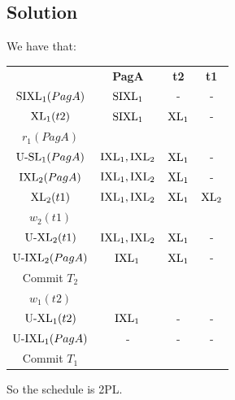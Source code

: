 \documentclass[12pt, a4paper]{report}
\begin{document}
    \subsection*{Solution}
        We have that: 
        \begin{table}[H]
            \centering
            \begin{tabular}{c|ccc|}
            \cline{2-4}
            \textit{}                    & \textbf{PagA}                           & \textbf{t2}          & \textbf{t1}           \\ \cline{2-4} 
            $\textnormal{SIXL}_1(PagA)$  & $\textnormal{SIXL}_1$                   & -                    & -                     \\
            $\textnormal{XL}_1(t2)$      & $\textnormal{SIXL}_1$                   & $\textnormal{XL}_1$  & -                     \\
            $r_1(PagA)$                  &                                         &                      &                       \\
            $\textnormal{U-SL}_1(PagA)$  & $\textnormal{IXL}_1,\textnormal{IXL}_2$ & $\textnormal{XL}_1$  & -                     \\
            $\textnormal{IXL}_2(PagA)$   & $\textnormal{IXL}_1,\textnormal{IXL}_2$ & $\textnormal{XL}_1$  & -                     \\
            $\textnormal{XL}_2(t1)$      & $\textnormal{IXL}_1,\textnormal{IXL}_2$ & $\textnormal{XL}_1$  & $\textnormal{XL}_2$   \\
            $w_2(t1)$                    &                                         &                      &                       \\
            $\textnormal{U-XL}_2(t1)$    & $\textnormal{IXL}_1,\textnormal{IXL}_2$ & $\textnormal{XL}_1$  & -                     \\
            $\textnormal{U-IXL}_2(PagA)$ & $\textnormal{IXL}_1$                    & $\textnormal{XL}_1$  & -                     \\
            Commit $T_2$                 &                                         &                      &                       \\
            $w_1(t2)$                    &                                         &                      &                       \\
            $\textnormal{U-XL}_1(t2)$    & $\textnormal{IXL}_1$                    & -                    & -                     \\
            $\textnormal{U-IXL}_1(PagA)$ & -                                       & -                    & -                     \\
            Commit $T_1$                 & \multicolumn{1}{l}{}                    & \multicolumn{1}{l}{} & \multicolumn{1}{l|}{} \\ \cline{2-4} 
            \end{tabular}
        \end{table}
        So the schedule is 2PL.
\end{document}
